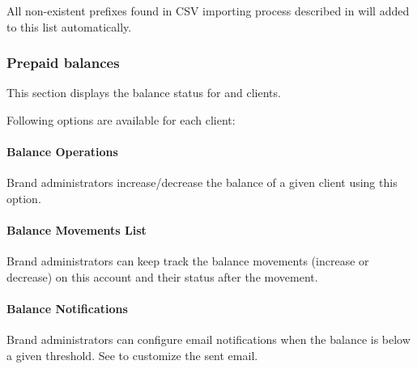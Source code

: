 \documentclass[letterpaper,10pt,english]{sphinxmanual}
\begin{document}
All non-existent prefixes found in CSV importing process described in {\hyperref[administration_portal/brand/billing/destination_rates:importing\string-a\string-csv\string-file]{}} will added to this list
automatically.


\subsubsection{Prepaid balances}
\label{administration_portal/brand/billing/prepaid_balances::doc}\label{administration_portal/brand/billing/prepaid_balances:prepaid-balances}
This section displays the balance status for {\hyperref[administration_portal/brand/billing/index:prepaid\string-billing]{}} and {\hyperref[administration_portal/brand/billing/index:pseudo\string-prepaid\string-billing]{}} clients.

Following options are available for each client:


\paragraph{Balance Operations}
\label{administration_portal/brand/billing/prepaid_balances:balance-operations}
Brand administrators increase/decrease the balance of a given client using this option.


\paragraph{Balance Movements List}
\label{administration_portal/brand/billing/prepaid_balances:balance-movements-list}
Brand administrators can keep track the balance movements (increase or decrease) on this account and their status
after the movement.


\paragraph{Balance Notifications}
\label{administration_portal/brand/billing/prepaid_balances:balance-notifications}
Brand administrators can configure email notifications when the balance is below a given threshold. See
{\hyperref[administration_portal/brand/settings/notification_templates:notification\string-templates]{}} to customize the sent email.
\end{document}
